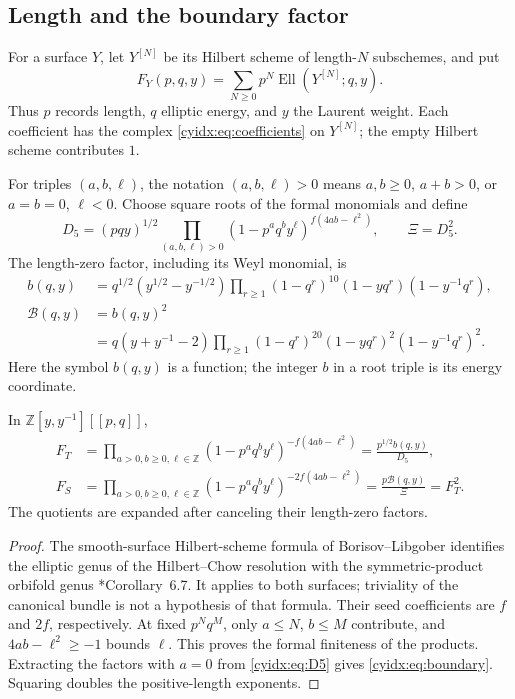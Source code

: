 \subsection{Length and the boundary factor}

For a surface \(Y\), let \(Y^{[N]}\) be its Hilbert scheme
of length-\(N\) subschemes, and put
\[
 F_Y(p,q,y)=\sum_{N\geq0}p^N
                  \operatorname{Ell}(Y^{[N]};q,y).
\]
Thus \(p\) records length, \(q\) elliptic energy, and
\(y\) the Laurent weight. Each coefficient has the
complex \eqref{cyidx:eq:coefficients} on \(Y^{[N]}\);
the empty Hilbert scheme contributes \(1\).

For triples \((a,b,\ell)\), the notation \((a,b,\ell)>0\)
means \(a,b\geq0\), \(a+b>0\), or \(a=b=0\), \(\ell<0\).
Choose square roots of the formal monomials and define
\begin{equation}\label{cyidx:eq:D5}
 D_5=(pqy)^{1/2}
       \prod_{(a,b,\ell)>0}
          (1-p^aq^by^\ell)^{f(4ab-\ell^2)},\qquad
 \Xi=D_5^2.
\end{equation}
The length-zero factor, including its Weyl monomial, is
\begin{equation}\label{cyidx:eq:boundary}
\begin{split}
 b(q,y)&=q^{1/2}(y^{1/2}-y^{-1/2})
       \prod_{r\geq1}(1-q^r)^{10}
                         (1-yq^r)(1-y^{-1}q^r),\\
 \mathcal B(q,y)&=b(q,y)^2\\
 &=q(y+y^{-1}-2)\prod_{r\geq1}
        (1-q^r)^{20}(1-yq^r)^2(1-y^{-1}q^r)^2.
\end{split}
\end{equation}
Here the symbol \(b(q,y)\) is a function; the integer \(b\)
in a root triple is its energy coordinate.

\begin{theorem}\label{cyidx:thm:Hilbert-product}
In \(\mathbb Z[y,y^{-1}][[p,q]]\),
\begin{align}
 F_T&=\prod_{a>0,b\geq0,\ell\in\mathbb Z}
       (1-p^aq^by^\ell)^{-f(4ab-\ell^2)}
       =\frac{p^{1/2}b(q,y)}{D_5},\label{cyidx:eq:Enriques}\\
 F_S&=\prod_{a>0,b\geq0,\ell\in\mathbb Z}
       (1-p^aq^by^\ell)^{-2f(4ab-\ell^2)}
       =\frac{p\mathcal B(q,y)}{\Xi}=F_T^2.
       \label{cyidx:eq:K3}
\end{align}
The quotients are expanded after canceling their
length-zero factors.
\end{theorem}
\begin{proof}
The smooth-surface Hilbert-scheme formula of
Borisov--Libgober identifies the elliptic genus of the
Hilbert--Chow resolution with the symmetric-product
orbifold genus \cite{rewriteBL2005}*{Corollary~6.7}.
It applies to both surfaces; triviality of the canonical
bundle is not a hypothesis of that formula. Their seed
coefficients are \(f\) and \(2f\), respectively.
At fixed \(p^Nq^M\), only \(a\leq N\), \(b\leq M\)
contribute, and \(4ab-\ell^2\geq-1\) bounds \(\ell\).
This proves the formal finiteness of the products.
Extracting the factors with \(a=0\) from
\eqref{cyidx:eq:D5} gives \eqref{cyidx:eq:boundary}.
Squaring doubles the positive-length exponents.
\end{proof}

